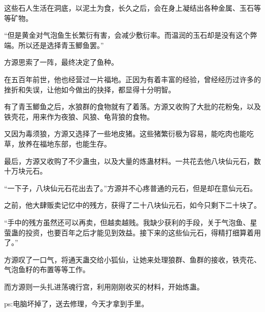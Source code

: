 \begin{this_body}
这些石人生活在洞底，以泥土为食，长久之后，会在身上凝结出各种金属、玉石等等矿物。

“但是黄金对气泡鱼生长繁衍有害，会减少敷衍率。而温润的玉石却是没有这个弊端。所以还是选择青玉鲫鱼罢。”

方源思索了一阵，最终决定了鱼种。

在五百年前世，他也经营过一片福地。正因为有着丰富的经验，曾经经历过许多的挫折和失误，让他如今做出的抉择，都显得十分明智。

有了青玉鲫鱼之后，水狼群的食物就有了着落。方源又收购了大批的花粉兔，以及铁壳花，用来作为夜狼、风狼、龟背狼的食物。

又因为毒须狼，方源又选择了一些地皮猪。这些猪繁衍极为容易，能吃肉也能吃草，放养在福地东部，也能生存。

最后，方源又收购了不少蛊虫，以及大量的炼蛊材料。一共花去他八块仙元石，数十万块元石。

“一下子，八块仙元石花出去了。”方源并不心疼普通的元石，但是却在意仙元石。

之前，他大肆贩卖记忆中的残方，获得了二十八块仙元石，如今只剩下二十块了。

“手中的残方虽然还可以再卖，但越卖越贱。我缺少获利的手段，关于气泡鱼、星萤蛊的投资，也要百年之后才能见到效益。接下来的这些仙元石，得精打细算着用了。”

方源叹了一口气，将通天蛊交给小狐仙，让她来处理狼群、鱼群的接收，铁壳花、气泡鱼籽的布置等等工作。

而方源则一头扎进荡魂行宫，利用刚刚收买的材料，开始炼蛊。

ps:电脑坏掉了，送去修理，今天才拿到手里。

\end{this_body}

